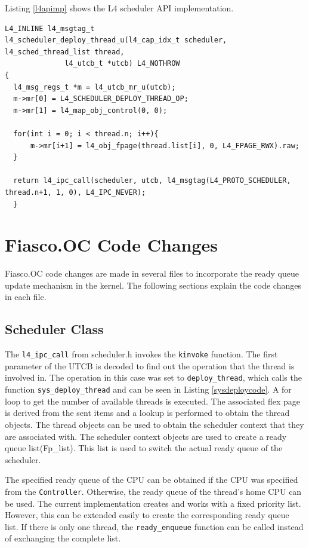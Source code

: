 Listing \ref{l4apimp} shows the L4 scheduler API implementation.

\begin{lstlisting}[caption={L4 scheduler API implementation},label={l4apimp}, style=customcpp]
L4_INLINE l4_msgtag_t
l4_scheduler_deploy_thread_u(l4_cap_idx_t scheduler, l4_sched_thread_list thread,
			  l4_utcb_t *utcb) L4_NOTHROW
{
  l4_msg_regs_t *m = l4_utcb_mr_u(utcb);
  m->mr[0] = L4_SCHEDULER_DEPLOY_THREAD_OP;
  m->mr[1] = l4_map_obj_control(0, 0);

  for(int i = 0; i < thread.n; i++){
	  m->mr[i+1] = l4_obj_fpage(thread.list[i], 0, L4_FPAGE_RWX).raw;
  }
  
  return l4_ipc_call(scheduler, utcb, l4_msgtag(L4_PROTO_SCHEDULER, thread.n+1, 1, 0), L4_IPC_NEVER);
  }
\end{lstlisting}
  
\section{Fiasco.OC Code Changes}
Fiasco.OC code changes are made in several files to incorporate the ready queue update mechanism in the kernel. The following sections explain the code changes in each file.

\subsection{Scheduler Class}

The \texttt{l4\_ipc\_call} from scheduler.h invokes the \texttt{kinvoke} function. The first parameter of the UTCB is decoded to find out the operation that the thread is involved in. The operation in this case was set to \texttt{deploy\_thread}, which calls the function \texttt{sys\_deploy\_thread} and can be seen in Listing \ref{sysdeploycode}. A for loop to get the number of available threads is executed. The associated flex page is derived from the sent items and a lookup is performed to obtain the thread objects. The thread objects can be used to obtain the scheduler context that they are associated with. The scheduler context objects are used to create a ready queue list(Fp\_list). This list is used to switch the actual ready queue of the scheduler.

The specified ready queue of the CPU can be obtained if the CPU was specified from the \texttt{Controller}. Otherwise, the ready queue of the thread's home CPU can be used. The current implementation creates and works with a fixed priority list. However, this can be extended easily to create the corresponding ready queue list. If there is only one thread, the \texttt{ready\_enqueue} function can be called instead of exchanging the complete list.


